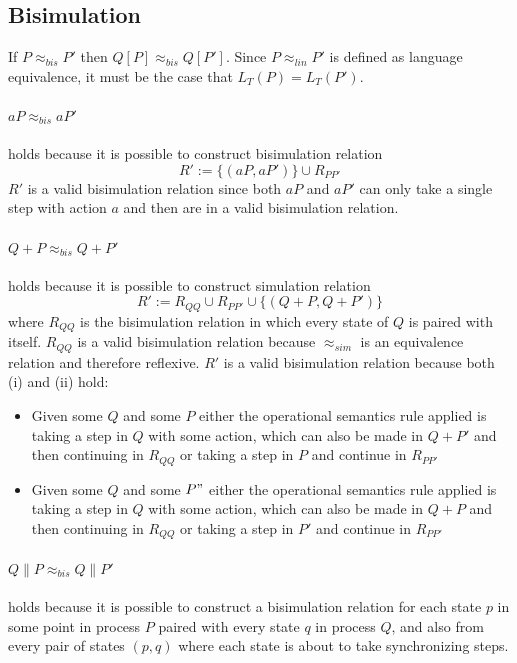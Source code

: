 \documentclass{article}
\begin{document}
\subsection{Bisimulation}
If $P \approx_{bis} P'$ then $Q[P] \approx_{bis} Q[P']$.
Since $P \approx_{lin} P'$ is defined as language equivalence, it must be the case that $L_T(P) = L_T(P')$.
\paragraph{$aP \approx_{bis} aP'$} holds because it is possible to construct bisimulation relation
$$R':= \{(aP, aP')\} \cup R_{PP'}$$
$R'$ is a valid bisimulation relation since both $aP$ and $aP'$ can only take a single step with action $a$ and then are in a valid bisimulation relation.
\paragraph{$Q + P \approx_{bis} Q + P'$} holds because it is possible to construct simulation relation
$$R':= R_{QQ} \cup R_{PP'} \cup \{(Q + P, Q + P')\}$$
where $R_{QQ}$ is the bisimulation relation in which every state of $Q$ is paired with itself.
$R_{QQ}$ is a valid bisimulation relation because $\approx_{sim}$ is an equivalence relation and therefore reflexive.
$R'$ is a valid bisimulation relation because both (i) and (ii) hold:
\begin{itemize}
		\item[(i)] Given some $Q$ and some $P$ either the operational semantics rule applied is taking a step in $Q$ with some action, which can also be made in $Q + P'$ and then continuing in $R_{QQ}$ or taking a step in $P$ and continue in $R_{PP'}$
		\item[(ii)] Given some $Q$ and some $P"$ either the operational semantics rule applied is taking a step in $Q$ with some action, which can also be made in $Q + P$ and then continuing in $R_{QQ}$ or taking a step in $P'$ and continue in $R_{PP'}$
\end{itemize}

\paragraph{$Q \parallel P \approx_{bis} Q \parallel P'$} holds because it is possible to construct a bisimulation relation for each state $p$ in some point in process $P$ paired with every state $q$ in process $Q$, and also from every pair of states $(p,q)$ where each state is about to take synchronizing steps.
\end{document}
